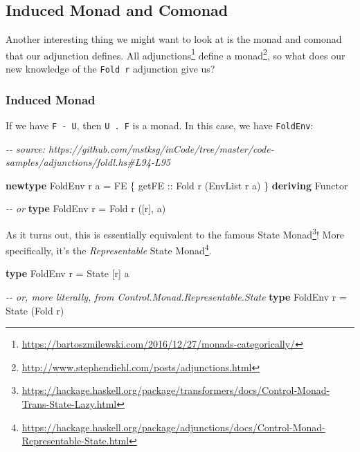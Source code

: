 \documentclass[]{article}
\newenvironment{Shaded}{}{}
\newcommand{\CommentTok}[1]{\textcolor[rgb]{0.38,0.63,0.69}{\textit{#1}}}
\newcommand{\DataTypeTok}[1]{\textcolor[rgb]{0.56,0.13,0.00}{#1}}
\newcommand{\KeywordTok}[1]{\textcolor[rgb]{0.00,0.44,0.13}{\textbf{#1}}}
\newcommand{\NormalTok}[1]{#1}
\newcommand{\OtherTok}[1]{\textcolor[rgb]{0.00,0.44,0.13}{#1}}
\renewcommand{\href}[2]{#2\footnote{\url{#1}}}
\begin{document}
\hypertarget{induced-monad-and-comonad}{%
\subsection{Induced Monad and Comonad}\label{induced-monad-and-comonad}}

Another interesting thing we might want to look at is the monad and comonad that
our adjunction defines.
\href{https://bartoszmilewski.com/2016/12/27/monads-categorically/}{All
adjunctions} \href{http://www.stephendiehl.com/posts/adjunctions.html}{define a
monad}, so what does our new knowledge of the \texttt{Fold\ r} adjunction give
us?

\hypertarget{induced-monad}{%
\subsubsection{Induced Monad}\label{induced-monad}}

If we have \texttt{F\ -\textbar{}\ U}, then \texttt{U\ .\ F} is a monad. In this
case, we have \texttt{FoldEnv}:

\begin{Shaded}
\begin{Highlighting}[]
\CommentTok{{-}{-} source: https://github.com/mstksg/inCode/tree/master/code{-}samples/adjunctions/foldl.hs\#L94{-}L95}

\KeywordTok{newtype} \DataTypeTok{FoldEnv}\NormalTok{ r a }\OtherTok{=} \DataTypeTok{FE}\NormalTok{ \{}\OtherTok{ getFE ::} \DataTypeTok{Fold}\NormalTok{ r (}\DataTypeTok{EnvList}\NormalTok{ r a) \}}
  \KeywordTok{deriving} \DataTypeTok{Functor}

\CommentTok{{-}{-} or}
\KeywordTok{type} \DataTypeTok{FoldEnv}\NormalTok{ r }\OtherTok{=} \DataTypeTok{Fold}\NormalTok{ r ([r], a)}
\end{Highlighting}
\end{Shaded}

As it turns out, this is essentially equivalent to the famous
\href{https://hackage.haskell.org/package/transformers/docs/Control-Monad-Trans-State-Lazy.html}{State
Monad}! More specifically, it's the
\href{https://hackage.haskell.org/package/adjunctions/docs/Control-Monad-Representable-State.html}{\emph{Representable}
State Monad}.

\begin{Shaded}
\begin{Highlighting}[]
\KeywordTok{type} \DataTypeTok{FoldEnv}\NormalTok{ r }\OtherTok{=} \DataTypeTok{State}\NormalTok{ [r] a}

\CommentTok{{-}{-} or, more literally, from Control.Monad.Representable.State}
\KeywordTok{type} \DataTypeTok{FoldEnv}\NormalTok{ r }\OtherTok{=} \DataTypeTok{State}\NormalTok{ (}\DataTypeTok{Fold}\NormalTok{ r)}
\end{Highlighting}
\end{Shaded}
\end{document}
